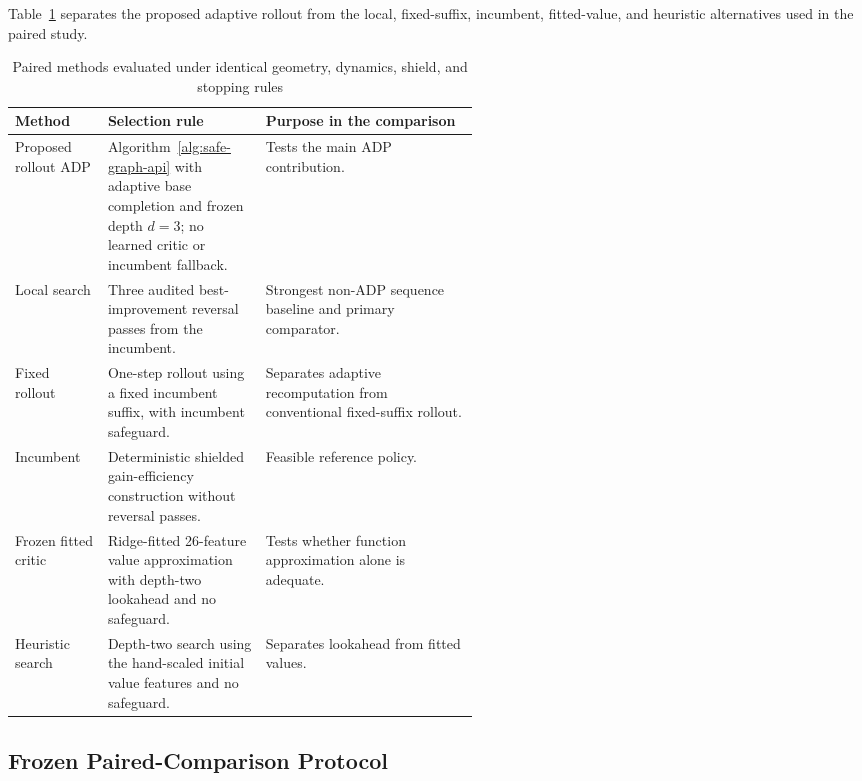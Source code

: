 \documentclass{IEEEtaes}
\theoremstyle{remark}
\theoremstyle{plain}
\begin{document}
Table~\ref{tab:baseline-definitions} separates the proposed adaptive rollout from the local, fixed-suffix, incumbent, fitted-value, and heuristic alternatives used in the paired study.

\begin{table}[t]
  \centering
  \caption{Paired methods evaluated under identical geometry, dynamics, shield, and stopping rules}
  \label{tab:baseline-definitions}
  \renewcommand{\arraystretch}{1.08}
  \setlength{\tabcolsep}{5pt}
  \footnotesize
  \begin{tabularx}{\linewidth}{@{}p{0.20\linewidth}p{0.34\linewidth}X@{}}
    \toprule
    Method & Selection rule & Purpose in the comparison \\
    \midrule
    Proposed rollout ADP & Algorithm~\ref{alg:safe-graph-api} with adaptive base completion and frozen depth $d=3$; no learned critic or incumbent fallback. & Tests the main ADP contribution. \\
    Local search & Three audited best-improvement reversal passes from the incumbent. & Strongest non-ADP sequence baseline and primary comparator. \\
    Fixed rollout & One-step rollout using a fixed incumbent suffix, with incumbent safeguard. & Separates adaptive recomputation from conventional fixed-suffix rollout. \\
    Incumbent & Deterministic shielded gain-efficiency construction without reversal passes. & Feasible reference policy. \\
    Frozen fitted critic & Ridge-fitted 26-feature value approximation with depth-two lookahead and no safeguard. & Tests whether function approximation alone is adequate. \\
    Heuristic search & Depth-two search using the hand-scaled initial value features and no safeguard. & Separates lookahead from fitted values. \\
    \bottomrule
  \end{tabularx}
\end{table}

\subsection{Frozen Paired-Comparison Protocol}
\end{document}
